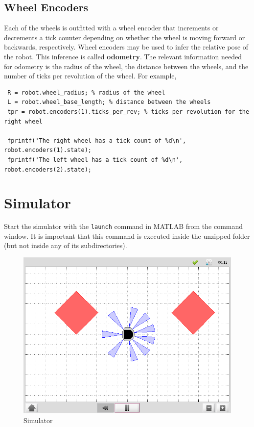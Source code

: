 \documentclass[10pt]{article}
\begin{document}
\subsection{Wheel Encoders}
Each of the wheels is outfitted with a wheel encoder that increments or decrements a tick counter depending on whether the wheel is moving forward or backwards, respectively. Wheel encoders may be used to infer the relative pose of the robot. This inference is called \textbf{odometry}. The relevant information needed for odometry is the radius of the wheel, the distance between the wheels, and the number of ticks per revolution of the wheel. For example,

\begin{verbatim}
 R = robot.wheel_radius; % radius of the wheel
 L = robot.wheel_base_length; % distance between the wheels
 tpr = robot.encoders(1).ticks_per_rev; % ticks per revolution for the right wheel

 fprintf('The right wheel has a tick count of %d\n', robot.encoders(1).state);
 fprintf('The left wheel has a tick count of %d\n', robot.encoders(2).state);
\end{verbatim}

\section{Simulator}

Start the simulator with the \texttt{launch} command in MATLAB from the command window. It is important that this command is executed inside the unzipped folder (but not inside any of its subdirectories).

\begin{figure}[h]
 \centering
 \includegraphics[scale=0.35]{simiam.png}
 \caption{Simulator}
 \label{fig:k3_sim}
\end{figure}
\end{document}
